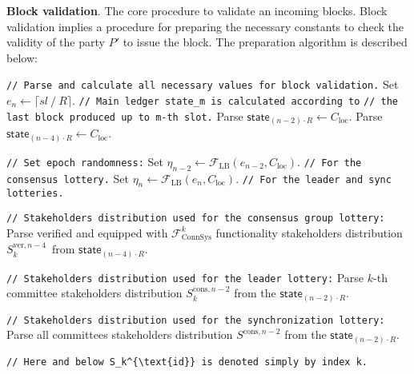 \textbf{Block validation}.\label{apndx:prepare-block-validation}
The core procedure to validate an incoming blocks.
Block validation implies a procedure for preparing the necessary constants to check the validity of the party $P'$ to issue the block.
The preparation algorithm is described below:
\begin{protocol}
    \caption{$\textsf{PrepareForBlockValidation}(P, \text{sid}, sl, R, l_{\text{VRF}}, K_{\text{f}}, C_{\text{loc}},
    v_{P'}^{\text{vrf}},  \mathbf{S}_{\text{id}} = \{S_k^{\text{id}}\}_{k=1}^K,
    \mathbf{f}_{\text{lead}} =  \{f^{\text{lead}}_k\}_{k=1}^K,
    \mathbf{f}_{\text{cons}} = \{f^{\text{cons}}_k\}_{k=1}^K)$}
    \begin{algorithmic}[1]
        \noindent
        \lstinline|// Parse and calculate all necessary values for block validation.|
        \State Set $e_n \leftarrow \lceil sl \mathbin{/} R \rceil$.
        \noindent
        \lstinline|// Main ledger state_m is calculated according to|
        \noindent
        \lstinline|// the last block produced up to m-th slot.|
        \State Parse $\textsf{state}_{(n - 2)\cdot R} \leftarrow C_{\text{loc}}$.
        \State Parse $\textsf{state}_{(n - 4)\cdot R} \leftarrow C_{\text{loc}}$.

        \noindent
        \lstinline|// Set epoch randomness:|
        \State Set ${\eta_{n-2} \leftarrow \mathcal{F}_{\text{LB}}(e_{n-2}, C_{\text{loc}})}$. \lstinline|// For the consensus lottery.|
        \State Set ${\eta_{n} \leftarrow \mathcal{F}_{\text{LB}}(e_{n}, C_{\text{loc}})}$. \lstinline|// For the leader and sync lotteries.|

        \noindent
        \lstinline|// Stakeholders distribution used for the consensus group lottery:|
        \State Parse verified and equipped with $\mathcal{F}^k_{\text{ConnSys}}$ functionality stakeholders distribution $S_k^{\text{ver}, {n - 4}}$\
        from $\textsf{state}_{(n - 4)\cdot R}$.

        \noindent
        \lstinline|// Stakeholders distribution used for the leader lottery:|
        \State Parse $k$-th committee stakeholders distribution $S_k^{\text{cons}, n - 2}$ from the $\textsf{state}_{(n - 2)\cdot R}$.

        \noindent
        \lstinline|// Stakeholders distribution used for the synchronization lottery:|
        \State Parse all committees stakeholders distribution $S^{\text{cons}, n - 2}$ from the $\textsf{state}_{(n - 2)\cdot R}$.

        \noindent
        \lstinline|// Here and below S_k^{\text{id}} is denoted simply by index k.|


\end{algorithmic}
\end{protocol}
